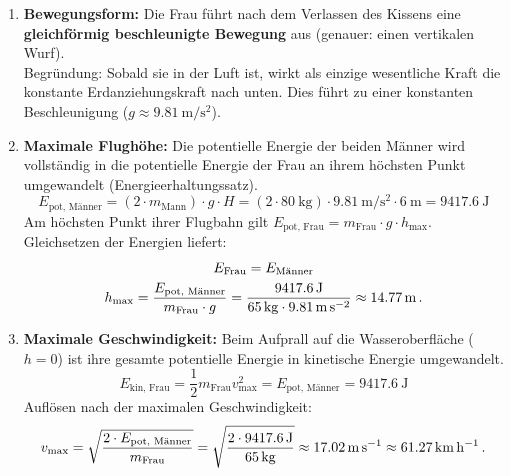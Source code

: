 \documentclass[ngerman]{scrreprt}
\newenvironment{loesungbox}[1]
  {\needspace{5\baselineskip}\begin{loesungboxstyle}[frametitle={#1}]}
  {\end{loesungboxstyle}}
\begin{document}
\begin{loesungbox}{Lösung zu \Cref{aufg:jump_bag}}
\begin{enumerate}
    \item \textbf{Bewegungsform:} Die Frau führt nach dem Verlassen des Kissens eine \\ \textbf{gleichförmig beschleunigte Bewegung} aus (genauer: einen vertikalen Wurf). \\
    Begründung: Sobald sie in der Luft ist, wirkt als einzige wesentliche Kraft die konstante Erdanziehungskraft nach unten. Dies führt zu einer konstanten Beschleunigung ($g \approx \SI{9.81}{\metre\per\second\squared}$).
    
    \item \textbf{Maximale Flughöhe:}
    Die potentielle Energie der beiden Männer wird vollständig in die potentielle Energie der Frau an ihrem höchsten Punkt umgewandelt (Energieerhaltungssatz).
    \begin{equation}\label{eq: jumpbag_epot_maenner}
        E_{\text{pot, Männer}} = (2 \cdot m_{\text{Mann}}) \cdot g \cdot H = (2 \cdot \SI{80}{\kg}) \cdot \SI{9.81}{\m\per\s\squared} \cdot \SI{6}{\m} = \SI{9417.6}{\joule}
    \end{equation}
    Am höchsten Punkt ihrer Flugbahn gilt $E_{\text{pot, Frau}} = m_{\text{Frau}} \cdot g \cdot h_{\text{max}}$. Gleichsetzen der Energien liefert:
    \begin{gather}\label{eq: jumpbag_hmax}
        E_\text{Frau} = E_\text{Männer} \\
        h_{\text{max}} = \frac{E_{\text{pot, Männer}}}{m_{\text{Frau}} \cdot g} = \frac{\SI{9417.6}{\joule}}{\SI{65}{\kg} \cdot \SI{9.81}{\m\per\s\squared}} \approx \SI{14.77}{\metre} \mDot
    \end{gather}

    \item \textbf{Maximale Geschwindigkeit:}
    Beim Aufprall auf die Wasseroberfläche ($h=0$) ist ihre gesamte potentielle Energie in kinetische Energie umgewandelt.
    \begin{equation}\label{eq: jumpbag_ekin_frau}
        E_{\text{kin, Frau}} = \frac{1}{2} m_{\text{Frau}} v_{\text{max}}^2 = E_{\text{pot, Männer}} = \SI{9417.6}{\joule}
    \end{equation}
    Auflösen nach der maximalen Geschwindigkeit:
    \begin{equation}\label{eq: jumpbag_vmax}
        v_{\text{max}} = \sqrt{\frac{2 \cdot E_{\text{pot, Männer}}}{m_{\text{Frau}}}} = \sqrt{\frac{2 \cdot \SI{9417.6}{\joule}}{\SI{65}{\kg}}} \approx \SI{17.02}{\metre\per\second} \approx \SI{61.27}{\kilo\meter\per\hour} \mDot
    \end{equation}
\end{enumerate}
\end{loesungbox}
\end{document}
